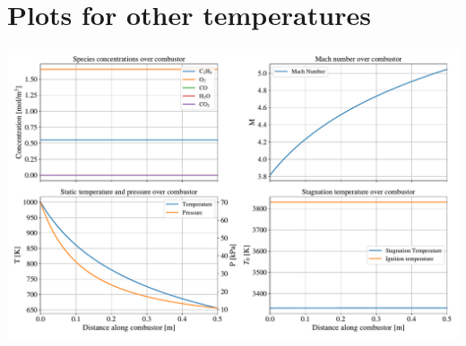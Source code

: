 \documentclass[a4paper]{article}
\begin{document}
\newpage
\appendix
\section{Plots for other temperatures}\label{app:other_plots}
\begin{widefigure}[20mm]
    \centering
    \includegraphics[width=\linewidth]{part_2_img/subfig_1000.pdf}
    \caption{Properties over combustion at \SI{1000}{\K}}
    \label{fig:properties_1000}
\end{widefigure}
\end{document}
